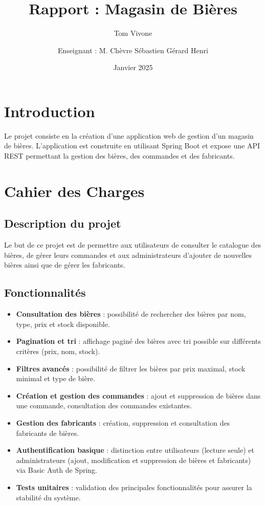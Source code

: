 \documentclass{article}
\title{Rapport : Magasin de Bières}
\author{Tom Vivone \and Enseignant : M. Chèvre Sébastien Gérard Henri}
\date{Janvier 2025}
\begin{document}
\maketitle

\section{Introduction}

Le projet consiste en la création d'une application web de gestion d'un magasin de bières.
L'application est construite en utilisant Spring Boot et expose une API REST permettant la gestion des bières, des commandes et des fabricants.

\section{Cahier des Charges}

\subsection{Description du projet}
Le but de ce projet est de permettre aux utilisateurs de consulter le catalogue des bières, de gérer leurs commandes et aux administrateurs d'ajouter de nouvelles bières ainsi que de gérer les fabricants.

\subsection{Fonctionnalités}
\begin{itemize}
    \item \textbf{Consultation des bières} : possibilité de rechercher des bières par nom, type, prix et stock disponible.
    \item \textbf{Pagination et tri} : affichage paginé des bières avec tri possible sur différents critères (prix, nom, stock).
    \item \textbf{Filtres avancés} : possibilité de filtrer les bières par prix maximal, stock minimal et type de bière.
    \item \textbf{Création et gestion des commandes} : ajout et suppression de bières dans une commande, consultation des commandes existantes.
    \item \textbf{Gestion des fabricants} : création, suppression et consultation des fabricants de bières.
    \item \textbf{Authentification basique} : distinction entre utilisateurs (lecture seule) et administrateurs (ajout, modification et suppression de bières et fabricants) via Basic Auth de Spring.
    \item \textbf{Tests unitaires} : validation des principales fonctionnalités pour assurer la stabilité du système.
\end{itemize}
\end{document}
